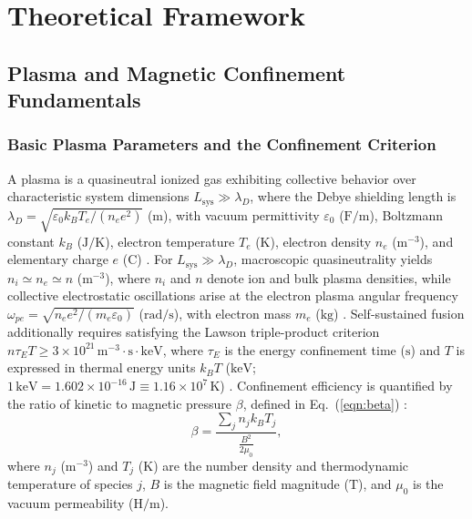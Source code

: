 \newpage 
{}
\section{Theoretical Framework}

\subsection{Plasma and Magnetic Confinement Fundamentals}

\subsubsection{Basic Plasma Parameters and the Confinement Criterion}
A plasma is a quasineutral ionized gas exhibiting collective behavior over characteristic system dimensions $L_{\mathrm{sys}} \gg \lambda_D$, where the Debye shielding length is $\lambda_D = \sqrt{\varepsilon_0 k_B T_e / (n_e e^2)}$ ($\mathrm{m}$), with vacuum permittivity $\varepsilon_0$ ($\mathrm{F/m}$), Boltzmann constant $k_B$ ($\mathrm{J/K}$), electron temperature $T_e$ ($\mathrm{K}$), electron density $n_e$ ($\mathrm{m^{-3}}$), and elementary charge $e$ ($\mathrm{C}$) \cite{chen2016introduction}. For $L_{\mathrm{sys}} \gg \lambda_D$, macroscopic quasineutrality yields $n_i \simeq n_e \simeq n$ ($\mathrm{m^{-3}}$), where $n_i$ and $n$ denote ion and bulk plasma densities, while collective electrostatic oscillations arise at the electron plasma angular frequency $\omega_{pe} = \sqrt{n_e e^2 / (m_e \varepsilon_0)}$ ($\mathrm{rad/s}$), with electron mass $m_e$ ($\mathrm{kg}$) \cite{chen2016introduction}. Self-sustained fusion additionally requires satisfying the Lawson triple-product criterion $n \tau_E T \ge 3 \times 10^{21}\,\mathrm{m^{-3}\cdot s\cdot keV}$, where $\tau_E$ is the energy confinement time ($\mathrm{s}$) and $T$ is expressed in thermal energy units $k_B T$ ($\mathrm{keV}$; $1\,\mathrm{keV} = 1.602 \times 10^{-16}\,\mathrm{J} \equiv 1.16 \times 10^{7}\,\mathrm{K}$) \cite{chen2016introduction}. Confinement efficiency is quantified by the ratio of kinetic to magnetic pressure $\beta$, defined in Eq.~(\ref{eqn:beta}) \cite{chen2016introduction}:
\begin{equation} 
\label{eqn:beta}
\beta = \frac{\sum_j n_j k_B T_j}{\frac{B^2}{2\mu_0}},
\end{equation}
\noindent where $n_j$ ($\mathrm{m^{-3}}$) and $T_j$ ($\mathrm{K}$) are the number density and thermodynamic temperature of species $j$, $B$ is the magnetic field magnitude ($\mathrm{T}$), and $\mu_0$ is the vacuum permeability ($\mathrm{H/m}$).

